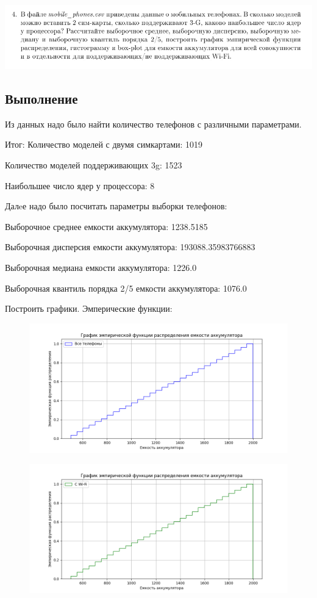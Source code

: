 \documentclass{article}
\begin{document}
\begin{center}
      \centering
      \includegraphics[width=1\linewidth]{2}
\end{center}

\subsection{Выполнение}\label{subsec:2}
Из данных надо было найти количество телефонов с различными параметрами.

Итог:
Количество моделей с двумя симкартами: 1019

Количество моделей поддерживающих 3g: 1523

Наибольшее число ядер у процессора: 8

Далeе надо было посчитать параметры выборки телефонов:

Выборочное среднее емкости аккумулятора: 1238.5185

Выборочная дисперсия емкости аккумулятора: 193088.35983766883

Выборочная медиана емкости аккумулятора: 1226.0

Выборочная квантиль порядка 2/5 емкости аккумулятора: 1076.0

Построить графики.
Эмперические функции:
\begin{figure}[H]
      \centering
      \includegraphics[width=0.5\linewidth]{Python/emper-all-phones}\label{fig:figure4}
\end{figure}

\begin{figure}[H]
      \centering
      \includegraphics[width=0.5\linewidth]{Python/emper-wi-fi}\label{fig:figure5}
\end{figure}
\end{document}
